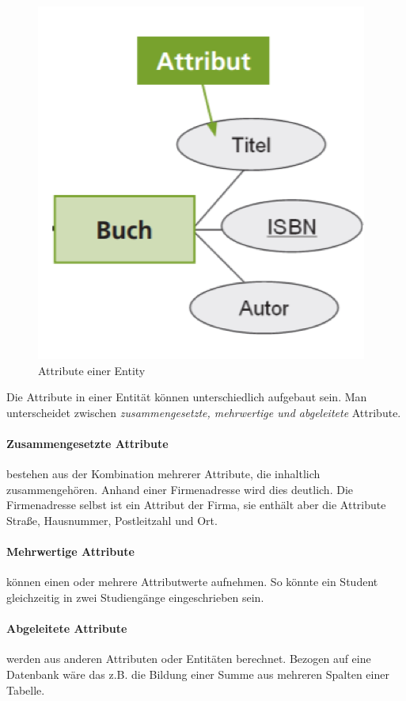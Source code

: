 \begin{figure}[h]
    \centering
    \includegraphics[width=.4\textwidth]{Content/images/modellierung/entity.png}
    \caption{Attribute einer Entity}
    \label{fig:modellierung:entity}
 \end{figure}

 Die Attribute in einer Entität können unterschiedlich aufgebaut sein. Man unterscheidet zwischen \emph{zusammengesetzte, mehrwertige und abgeleitete} Attribute.

 \paragraph{Zusammengesetzte Attribute} bestehen aus der Kombination mehrerer Attribute, die inhaltlich zusammengehören. Anhand einer Firmenadresse wird dies deutlich. Die Firmenadresse selbst ist ein Attribut der Firma, sie enthält aber die Attribute Straße, Hausnummer, Postleitzahl und Ort.

 \paragraph{Mehrwertige Attribute} können einen oder mehrere Attributwerte aufnehmen. So könnte ein Student gleichzeitig in zwei Studiengänge eingeschrieben sein.

 \paragraph{Abgeleitete Attribute} werden aus anderen Attributen oder Entitäten berechnet. Bezogen auf eine Datenbank wäre das z.B. die Bildung einer Summe aus mehreren Spalten einer Tabelle.
